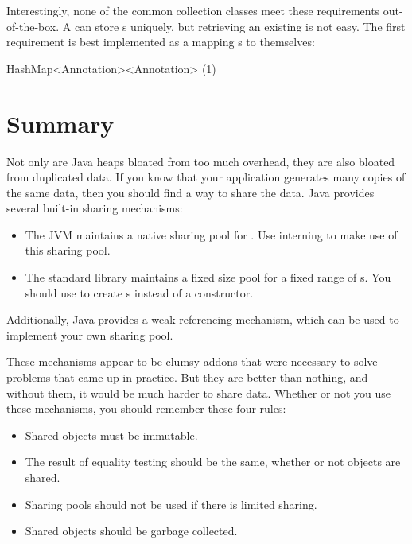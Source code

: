 Interestingly, none of the common collection classes meet these
requirements out-of-the-box. A  can store
s uniquely, but retrieving an existing  is not easy. 
The first requirement is best implemented as a  mapping
s to themselves:
\begin{shortlisting}
 	HashMap<Annotation><Annotation>   (1)
\end{shortlisting}


\section{Summary} 

Not only are Java heaps bloated from too much overhead, they
are also bloated from duplicated data. If you know that your application
generates many copies of the same data, then you should find a way to share the
data. Java provides several built-in sharing mechanisms:

\begin{itemize}
  \item The JVM maintains a native sharing
  pool for . Use  interning to make use of this
  sharing pool.
  \item The standard library maintains a fixed size pool for
   a fixed range of  s. You should use  to create
   s instead of a constructor.
\end{itemize}
Additionally, Java provides a weak referencing mechanism, which can be used to
implement your own sharing pool.

These mechanisms appear to be clumsy addons that were necessary to solve
problems that came up in practice. But they are better than nothing, and
without them, it would be much harder to share data. 
Whether or not you use these mechanisms, you should remember these four rules:
\begin{itemize}
  \item Shared objects must be immutable.
  \item The result of equality testing should be the same, whether or
not objects are shared.  
  \item Sharing pools should not be used if there is limited sharing.
  \item Shared objects should be garbage collected.
\end{itemize}





